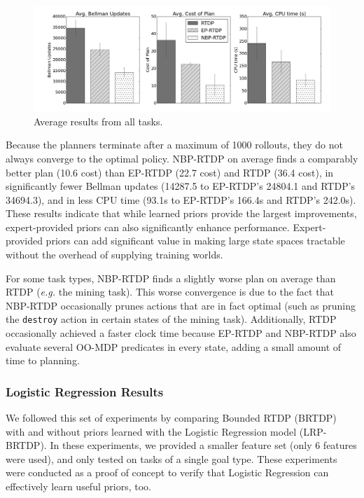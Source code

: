 \documentclass[11pt]{article}
\begin{document}
\begin{figure}[t]
\centering
\includegraphics[width=1\linewidth]{figures/avg_results.png}%
\caption{Average results from all tasks.}
\label{fig:average_results}
\end{figure}

Because the planners terminate after a maximum of 1000
rollouts, they do not always converge to the optimal policy. NBP-RTDP on
average finds a comparably better plan (10.6 cost) than EP-RTDP (22.7
cost) and RTDP (36.4 cost), in significantly fewer
Bellman updates (14287.5 to EP-RTDP's 24804.1 and RTDP's 34694.3), and in
less CPU time (93.1s to EP-RTDP's 166.4s and RTDP's 242.0s).  These
results indicate that while learned priors provide the largest
improvements, expert-provided priors can also significantly
enhance performance. Expert-provided priors can add
significant value in making large state spaces tractable without the
overhead of supplying training worlds.

For some task types, NBP-RTDP finds a slightly worse plan on average than
RTDP ({\em e.g.} the mining task). This worse convergence is due to the fact that NBP-RTDP
occasionally prunes actions that are in fact optimal (such as
pruning the \texttt{destroy} action in certain states of the mining task).
Additionally, RTDP occasionally achieved a faster clock time because EP-RTDP and NBP-RTDP also evaluate several OO-MDP predicates in every state, adding a small amount of time to planning.

\subsubsection{Logistic Regression Results}
We followed this set of experiments by comparing Bounded RTDP (BRTDP) with and without priors learned with the Logistic Regression model (LRP-BRTDP). In these experiments, we provided a smaller feature set (only 6 features were used), and only tested on tasks of a single goal type. These experiments were conducted as a proof of concept to verify that Logistic Regression can effectively learn useful priors, too.
\end{document}
